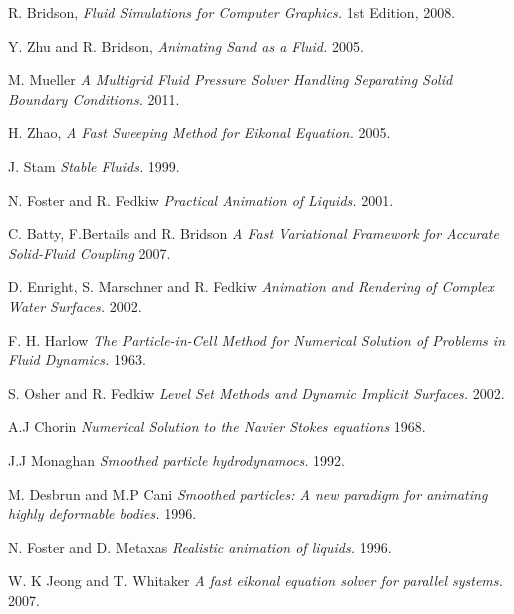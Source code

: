 \begin{thebibliography}{9}

  R. Bridson,
  \emph{Fluid Simulations for Computer Graphics.}
  1st Edition,
  2008.

  Y. Zhu and R. Bridson,
  \emph{Animating Sand as a Fluid.}
  2005.

  M. Mueller
  \emph{A Multigrid Fluid Pressure Solver Handling Separating Solid Boundary Conditions.}
  2011.

  H. Zhao, 
  \emph{A Fast Sweeping Method for Eikonal Equation.}
  2005.

  J. Stam
  \emph{Stable Fluids.}
  1999.

  N. Foster and R. Fedkiw
  \emph{Practical Animation of Liquids.}
  2001.

  C. Batty, F.Bertails and R. Bridson
  \emph{A Fast Variational Framework for Accurate Solid-Fluid Coupling}
  2007.

  D. Enright, S. Marschner and R. Fedkiw
  \emph{Animation and Rendering of Complex Water Surfaces.}
  2002.

  F. H. Harlow 
  \emph{The Particle-in-Cell Method for Numerical Solution of Problems in Fluid Dynamics.}
  1963.

  S. Osher and R. Fedkiw
  \emph{Level Set Methods and Dynamic Implicit Surfaces.}
  2002.

  A.J Chorin
  \emph{Numerical Solution to the Navier Stokes equations}
  1968.

 J.J Monaghan
 \emph{Smoothed particle hydrodynamocs.}
 1992.

  M. Desbrun and M.P Cani
  \emph {Smoothed particles: A new paradigm for animating highly deformable bodies.}
  1996.

  N. Foster and D. Metaxas
  \emph{Realistic animation of liquids.}
  1996.

  W. K Jeong and T. Whitaker
  \emph{A fast eikonal equation solver for parallel systems.}
  2007.

\end{thebibliography}
